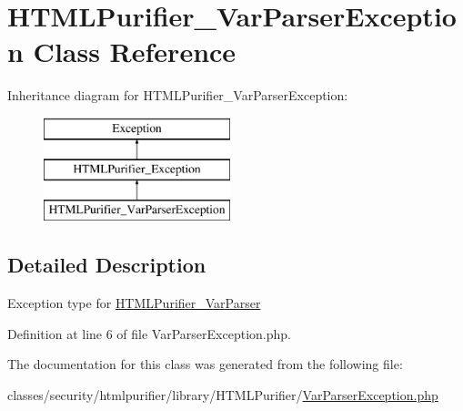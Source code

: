 \hypertarget{classHTMLPurifier__VarParserException}{\section{H\+T\+M\+L\+Purifier\+\_\+\+Var\+Parser\+Exception Class Reference}
\label{classHTMLPurifier__VarParserException}
}
Inheritance diagram for H\+T\+M\+L\+Purifier\+\_\+\+Var\+Parser\+Exception\+:\begin{figure}[H]
\begin{center}
\leavevmode
\includegraphics[height=3.000000cm]{classHTMLPurifier__VarParserException}
\end{center}
\end{figure}


\subsection{Detailed Description}
Exception type for \hyperlink{classHTMLPurifier__VarParser}{H\+T\+M\+L\+Purifier\+\_\+\+Var\+Parser} 

Definition at line 6 of file Var\+Parser\+Exception.\+php.



The documentation for this class was generated from the following file\+:\begin{DoxyCompactItemize}
\item 
classes/security/htmlpurifier/library/\+H\+T\+M\+L\+Purifier/\hyperlink{VarParserException_8php}{Var\+Parser\+Exception.\+php}\end{DoxyCompactItemize}
